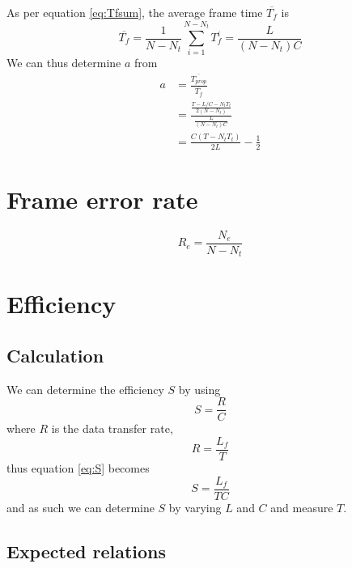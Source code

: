\documentclass[a4paper, 11pt]{report}
\begin{document}
As per equation \ref{eq:Tfsum}, the average frame time $\overline{T_f}$ is 
\begin{equation} \label{eq:Tfmean}
	\overline{T_f} = \frac{1}{N-N_t}\sum_{i=1}^{N-N_t}{T_f^i} = \frac{L}{(N-N_t) C}
\end{equation}
We can thus determine $a$ from
\begin{equation}
\begin{alignedat}{2}
	a
	& = \frac{\overline{T_{prop}}}{\overline{T_f}} \\
	& = \frac{\frac{T - L/C - N_t T_t}{2 (N-N_t)}}{\frac{L}{(N-N_t) C}} \\
	& = \frac{C(T - N_t T_t)}{2 L} - \frac{1}{2}
\end{alignedat}
\end{equation}

\section{Frame error rate}

\begin{equation} \label{eq:Re}
	R_e = \frac{N_e}{N - N_t}
\end{equation}

\section{Efficiency}

\subsection{Calculation}

We can determine the efficiency $S$ by using 
\begin{equation} \label{eq:S}
	S = \frac{R}{C}
\end{equation}
where $R$ is the data transfer rate,
\begin{equation} \label{eq:R}
	R = \frac{L_f}{T}
\end{equation}
thus equation \ref{eq:S} becomes
\begin{equation} \label{eq:S2}
	S = \frac{L_f}{T C}
\end{equation}
and as such we can determine $S$ by varying $L$ and $C$ and measure $T$.

\subsection{Expected relations}
\end{document}
